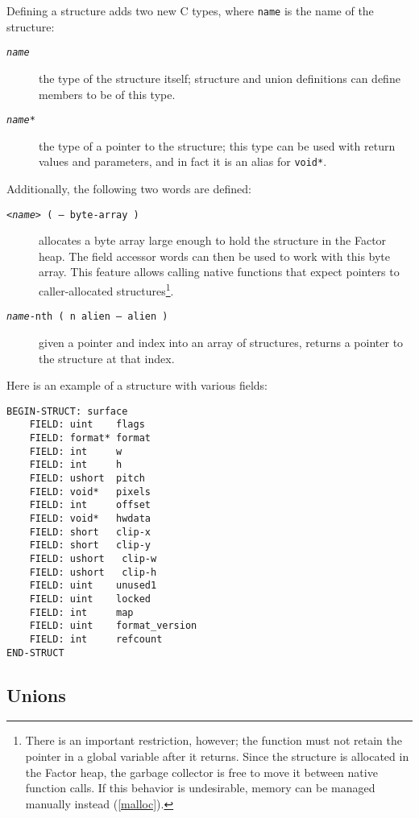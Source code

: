\documentclass{book}
\begin{document}
Defining a structure adds two new C types, where \verb|name| is the name of the structure:
\begin{description}
\item[\texttt{\emph{name}}] the type of the structure itself; structure and union definitions can define members to be of this type.
\item[\texttt{\emph{name}*}] the type of a pointer to the structure; this type can be used with return values and parameters, and in fact it is an alias for \texttt{void*}.
\end{description}
Additionally, the following two words are defined:
\begin{description}
\item[\texttt{<\emph{name}> ( -- byte-array )}] allocates a byte array large enough to hold the structure in the Factor heap. The field accessor words can then be used to work with this byte array. This feature allows calling native functions that expect pointers to caller-allocated structures\footnote{
There is an important restriction, however; the function must not retain the pointer in a global variable after it returns. Since the structure is allocated in the Factor heap, the garbage collector is free to move it between native function calls. If this behavior is undesirable, memory can be managed manually instead (\ref{malloc}).}.
\item[\texttt{\emph{name}-nth ( n alien -- alien )}] given a pointer and index into an array of structures, returns a pointer to the structure at that index.
\end{description}

Here is an example of a structure with various fields:
\begin{verbatim}
BEGIN-STRUCT: surface
    FIELD: uint    flags
    FIELD: format* format
    FIELD: int     w
    FIELD: int     h
    FIELD: ushort  pitch
    FIELD: void*   pixels
    FIELD: int     offset
    FIELD: void*   hwdata
    FIELD: short   clip-x
    FIELD: short   clip-y
    FIELD: ushort   clip-w
    FIELD: ushort   clip-h
    FIELD: uint    unused1
    FIELD: uint    locked
    FIELD: int     map
    FIELD: uint    format_version
    FIELD: int     refcount
END-STRUCT
\end{verbatim}

\subsection{Unions}\label{alien-unions}
\end{document}
